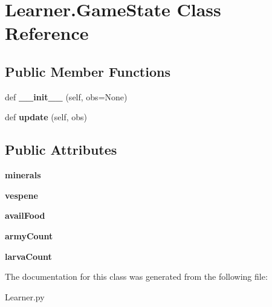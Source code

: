\hypertarget{classLearner_1_1GameState}{}\section{Learner.\+Game\+State Class Reference}
\label{classLearner_1_1GameState}
\subsection*{Public Member Functions}
\begin{DoxyCompactItemize}
\item 
def {\bfseries \+\_\+\+\_\+init\+\_\+\+\_\+} (self, obs=None)\hypertarget{classLearner_1_1GameState_a1839473bc83bc75d01684ec5aea9cbb8}{}\label{classLearner_1_1GameState_a1839473bc83bc75d01684ec5aea9cbb8}

\item 
def {\bfseries update} (self, obs)\hypertarget{classLearner_1_1GameState_a6f8a28737862d479f5bf027296613ea1}{}\label{classLearner_1_1GameState_a6f8a28737862d479f5bf027296613ea1}

\end{DoxyCompactItemize}
\subsection*{Public Attributes}
\begin{DoxyCompactItemize}
\item 
{\bfseries minerals}\hypertarget{classLearner_1_1GameState_a386c1763948e0b1d0d5cccfb2249dab5}{}\label{classLearner_1_1GameState_a386c1763948e0b1d0d5cccfb2249dab5}

\item 
{\bfseries vespene}\hypertarget{classLearner_1_1GameState_a1cfbd3d55a66b1897be33620ace654c0}{}\label{classLearner_1_1GameState_a1cfbd3d55a66b1897be33620ace654c0}

\item 
{\bfseries avail\+Food}\hypertarget{classLearner_1_1GameState_ac42a209d42ef18e10585f3adeb1b71c9}{}\label{classLearner_1_1GameState_ac42a209d42ef18e10585f3adeb1b71c9}

\item 
{\bfseries army\+Count}\hypertarget{classLearner_1_1GameState_a2e78cbeaff230eaaa0abab498f5f5930}{}\label{classLearner_1_1GameState_a2e78cbeaff230eaaa0abab498f5f5930}

\item 
{\bfseries larva\+Count}\hypertarget{classLearner_1_1GameState_a9fbf37652166056005e255288d8fe624}{}\label{classLearner_1_1GameState_a9fbf37652166056005e255288d8fe624}

\end{DoxyCompactItemize}


The documentation for this class was generated from the following file\+:\begin{DoxyCompactItemize}
\item 
Learner.\+py\end{DoxyCompactItemize}
